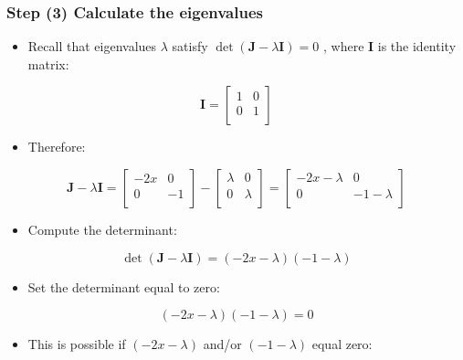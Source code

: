 \documentclass[
]{article}
\providecommand{\tightlist}{%
  \setlength{\itemsep}{0pt}\setlength{\parskip}{0pt}}
\begin{document}
\hypertarget{step-3-calculate-the-eigenvalues}{%
\subsubsection{Step (3) Calculate the
eigenvalues}\label{step-3-calculate-the-eigenvalues}}

\begin{itemize}
\tightlist
\item
  Recall that eigenvalues \(\lambda\) satisfy
  \(\det(\mathbf{J} - \lambda \mathbf{I}) = 0\) , where \(\mathbf{I}\)
  is the identity matrix:
\end{itemize}

\[
\mathbf{I} = 
\begin{bmatrix}
1 & 0 \\
0 & 1 \\
\end{bmatrix}
\]

\begin{itemize}
\tightlist
\item
  Therefore:
\end{itemize}

\[
\mathbf{J} - \lambda \mathbf{I} = 
\begin{bmatrix}
-2x & 0 \\
0 & -1 \\
\end{bmatrix}
-
\begin{bmatrix}
\lambda & 0 \\
0 & \lambda \\
\end{bmatrix}
=
\begin{bmatrix}
-2x-\lambda & 0 \\
0 & -1-\lambda \\
\end{bmatrix}
\]

\begin{itemize}
\tightlist
\item
  Compute the determinant:
\end{itemize}

\[
\det(\mathbf{J} - \lambda \mathbf{I}) = (-2x-\lambda) (-1-\lambda)
\]

\begin{itemize}
\tightlist
\item
  Set the determinant equal to zero:
\end{itemize}

\[ (-2x-\lambda) (-1-\lambda) = 0 \]

\begin{itemize}
\tightlist
\item
  This is possible if \((-2x-\lambda)\) and/or \((-1-\lambda)\) equal
  zero:
\end{itemize}
\end{document}
